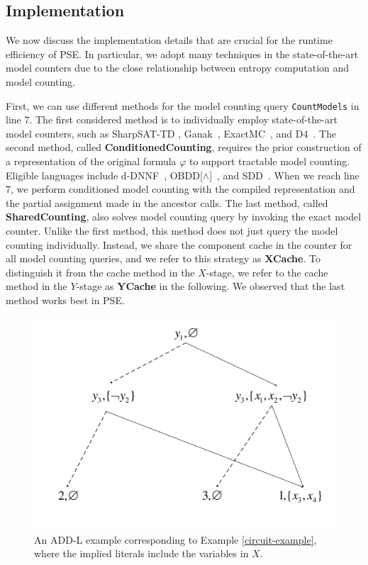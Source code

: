 \subsection{Implementation}

We now discuss the implementation details that are crucial for the runtime efficiency of PSE. In particular, we adopt many techniques in the state-of-the-art model counters due to the close relationship between entropy computation and model counting.

First, we can use different methods for the model counting query \texttt{CountModels} in line 7.
The first considered method is to individually employ state-of-the-art model counters, such as SharpSAT-TD \cite{korhonen2021integrating}, Ganak~\cite{sharma2019ganak}, ExactMC~\cite{lai2021power}, and D4~\cite{lagniez2017improved}.
The second method, called \textbf{ConditionedCounting}, requires the prior construction of a representation of the original formula $\varphi$ to support tractable model counting.
Eligible languages include d-DNNF~\cite{darwiche2004new}, OBDD[$\land$]~\cite{lai2017new}, and SDD~\cite{choi2013compiling}.
When we reach line 7, we perform conditioned model counting with the compiled representation and the partial assignment made in the ancestor calls. 
The last method, called \textbf{SharedCounting}, also solves model counting query by invoking the exact model counter.
Unlike the first method, this method does not just query the model counting individually.
Instead, we share the component cache in the counter for all model counting queries, and we refer to this strategy as \textbf{XCache}.
To distinguish it from the cache method in the $X$-stage, we refer to the cache method in the $Y$-stage as \textbf{YCache} in the following.
We observed that the last method works best in PSE.

\begin{figure}[!htbp]
	
	\centering
	\includegraphics[width=0.7\linewidth]{figures/ADD-L-example2.pdf}
	\caption{An ADD-L example corresponding to Example \ref{circuit-example}, where the implied literals include the variables in $X$. }
	\label{fig:ADDL-example2}
\end{figure} 

